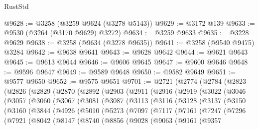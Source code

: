 \begin{lexlean}{RustStd}
\begin{coremodule}
@9628 := @3258 (@3259 @9624 (@3278 @5143))
@9629 := @3172 @139
@9633 := @9530 (@3264 (@3170 @9629) @3272)
@9634 := @3259 @9633
@9635 := @3228 @9629
@9638 := @3258 (@9634 (@3278 @9635))
@9641 := @3258 (@9540 @9475) @3284
@9642 := @9638 @9641
@9643 := @9628 @9642
@9644 := @9621 @9643
@9645 := @9613 @9644
@9646 := @9606 @9645
@9647 := @9600 @9646
@9648 := @9596 @9647
@9649 := @9589 @9648
@9650 := @9582 @9649
@9651 := @9577 @9650
@9652 := @9575 @9651
@9701 := @2721
    (@2774
      (@2784
        (@2823
          (@2826
            (@2829
              (@2870
                (@2892
                  (@2903
                    (@2911
                      (@2916
                        (@2919
                          (@3022
                            (@3046
                              (@3057
                                (@3060
                                  (@3067
                                    (@3081
                                      (@3087
                                        (@3113
                                          (@3116
                                            (@3128
                                              (@3137
                                                (@3150
                                                  (@3160
                                                    (@3844
                                                      (@4926
                                                        (@5010
                                                          (@5273
                                                            (@7097
                                                              (@7117
                                                                (@7161
                                                                  (@7247
                                                                    (@7296
                                                                      (@7921
                                                                        (@8042
                                                                          (@8147
                                                                            (@8740
                                                                              (@8856
                                                                                (@9028
                                                                                  (@9063
                                                                                    (@9161
                                                                                      (@9357

\end{coremodule}
\end{lexlean}
